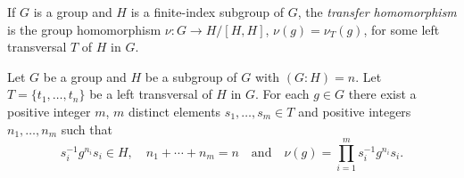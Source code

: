 If $G$ is a group and $H$ is a finite-index subgroup of $G$, the 
{\em transfer homomorphism} is the group homomorphism $\nu\colon G\to H/[H,H]$,
$\nu(g)=\nu_T(g)$, for some left transversal $T$ of $H$ in $G$.
	
%
%
%


\begin{lemma}
	\label{lem:evaluation}
	Let $G$ be a group and $H$ be a subgroup of $G$ with $(G:H)=n$. Let 
	$T=\{t_1,\dots,t_n\}$ be a left transversal of $H$ in $G$.  
	For each $g\in G$ there exist a positive integer
	$m$,  $m$ distinct
	elements $s_{1},\dots,s_{m}\in T$ 
	and positive integers $n_1,\dots,n_m$
	such that 
	\[
	s_i^{-1}g^{n_i}s_i\in H,
	\quad
	n_1+\cdots+n_m=n\quad\text{and}\quad   
	\nu(g)=\prod_{i=1}^m s_i^{-1}g^{n_i}s_i.
	\]
\end{lemma}

